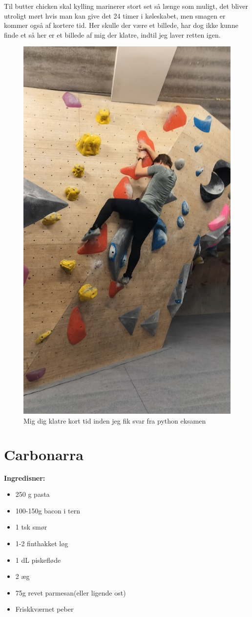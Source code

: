 \documentclass{book}
\begin{document}
Til butter chicken skal kylling marinerer stort set så længe som muligt, det bliver utroligt mørt hvis man kan give det 24 timer i køleskabet, men smagen er kommer også af kortere tid.
\newpage Her skulle der være et billede, har dog ikke kunne finde et så her er et billede af mig der klatre, indtil jeg laver retten igen.
\begin{figure}
    \centering
    \includegraphics[width=0.5\linewidth]{Klatring.jpg}
    \caption{Mig dig klatre kort tid inden jeg fik svar fra python eksamen}
    \label{fig:Klatring}
\end{figure}
\newpage \section{Carbonarra}
\begin{minipage}[t]{0.5\textwidth}
\textbf{Ingredisner:}
\begin{itemize}
    \item 250 g pasta
    \item 100-150g bacon i tern
    \item 1 tsk smør
    \item 1-2 finthakket løg
    \item 1 dL piskefløde
    \item 2 æg
    \item 75g revet parmesan(eller ligende ost)
    \item Friskkværnet peber
\end{itemize}
\end{minipage}
\end{document}
